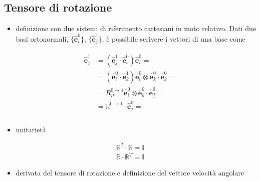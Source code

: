 \documentclass[letterpaper,10pt,english]{jupyterBook}
\begin{document}
\subsection{Tensore di rotazione}
\label{\detokenize{ch/kinematics-rigid:tensore-di-rotazione}}
\sphinxAtStartPar
{}
\begin{itemize}
\item {} 
\sphinxAtStartPar
definizione con due sistemi di riferimento cartesiani in moto relativo. Dati due basi ortonormali, \(\{\hat{\mathbf{e}}^0_i\}\), \(\{\hat{\mathbf{e}}^1_j\}\), è possibile scrivere i vettori di una base come

\end{itemize}
\begin{equation*}
\begin{split}\begin{aligned}
  \hat{\mathbf{e}}^1_j & = (\hat{\mathbf{e}}^1_j \cdot \hat{\mathbf{e}}^0_i ) \hat{\mathbf{e}}^0_i = \\
                       & = (\hat{\mathbf{e}}^0_i \cdot \hat{\mathbf{e}}^1_k ) \hat{\mathbf{e}}^0_i \otimes \hat{\mathbf{e}}^0_k \cdot \hat{\mathbf{e}}^0_k = \\
                       & = R^{0\rightarrow 1}_{ik} \hat{\mathbf{e}}^0_i \otimes \hat{\mathbf{e}}^0_k \cdot \hat{\mathbf{e}}^0_j = \\
                       & = \mathbb{R}^{0 \rightarrow 1} \cdot \hat{\mathbf{e}}^0_j = \\
\end{aligned}\end{split}
\end{equation*}\begin{itemize}
\item {} 
\sphinxAtStartPar
unitarietà

\end{itemize}
\begin{equation*}
\begin{split}\mathbb{R}^T \cdot \mathbb{R}  = \mathbb{I}\end{split}
\end{equation*}\begin{equation*}
\begin{split}\mathbb{R} \cdot \mathbb{R}^T  = \mathbb{I}\end{split}
\end{equation*}\begin{itemize}
\item {} 
\sphinxAtStartPar
derivata del tensore di rotazione e definizione del vettore velocità angolare

\end{itemize}
\end{document}
